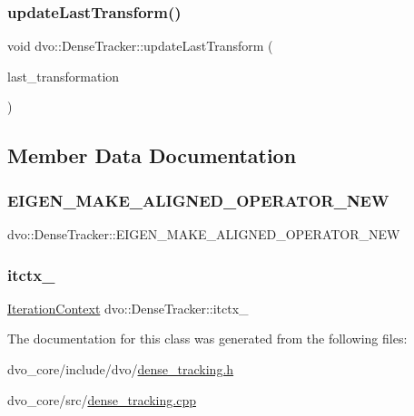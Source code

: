\subsubsection{\texorpdfstring{update\+Last\+Transform()}{updateLastTransform()}}
{\footnotesize\ttfamily void dvo\+::\+Dense\+Tracker\+::update\+Last\+Transform (\begin{DoxyParamCaption}\item[{Eigen\+::\+Affine3d \&}]{last\+\_\+transformation }\end{DoxyParamCaption})}



\subsection{Member Data Documentation}
\mbox{\label{classdvo_1_1_dense_tracker_a5ee11c294ea7be93c11f6b7ab202b236}} 
\subsubsection{\texorpdfstring{E\+I\+G\+E\+N\+\_\+\+M\+A\+K\+E\+\_\+\+A\+L\+I\+G\+N\+E\+D\+\_\+\+O\+P\+E\+R\+A\+T\+O\+R\+\_\+\+N\+EW}{EIGEN\_MAKE\_ALIGNED\_OPERATOR\_NEW}}
{\footnotesize\ttfamily dvo\+::\+Dense\+Tracker\+::\+E\+I\+G\+E\+N\+\_\+\+M\+A\+K\+E\+\_\+\+A\+L\+I\+G\+N\+E\+D\+\_\+\+O\+P\+E\+R\+A\+T\+O\+R\+\_\+\+N\+EW}

\mbox{\label{classdvo_1_1_dense_tracker_a8ce3afa309ab0f9063da110f18797ec7}} 
\subsubsection{\texorpdfstring{itctx\+\_\+}{itctx\_}}
{\footnotesize\ttfamily \mbox{\hyperlink{structdvo_1_1_dense_tracker_1_1_iteration_context}{Iteration\+Context}} dvo\+::\+Dense\+Tracker\+::itctx\+\_\+}



The documentation for this class was generated from the following files\+:\begin{DoxyCompactItemize}
\item 
dvo\+\_\+core/include/dvo/\mbox{\hyperlink{dense__tracking_8h}{dense\+\_\+tracking.\+h}}\item 
dvo\+\_\+core/src/\mbox{\hyperlink{dense__tracking_8cpp}{dense\+\_\+tracking.\+cpp}}\end{DoxyCompactItemize}
